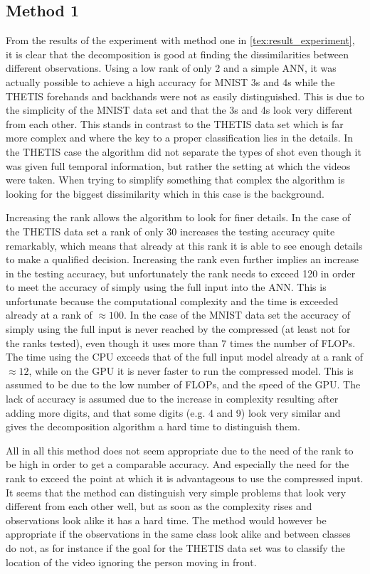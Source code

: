 \subsection{Method 1}
From the results of the experiment with method one in \autoref{tex:result_experiment}, it is clear that the decomposition is good at finding the dissimilarities between different observations. Using a low rank of only 2 and a simple ANN, it was actually possible to achieve a high accuracy for MNIST 3s and 4s while the THETIS forehands and backhands were not as easily distinguished. This is due to the simplicity of the MNIST data set and that the 3s and 4s look very different from each other. This stands in contrast to the THETIS data set which is far more complex and where the key to a proper classification lies in the details. In the THETIS case the algorithm did not separate the types of shot even though it was given full temporal information, but rather the setting at which the videos were taken. When trying to simplify something that complex the algorithm is looking for the biggest dissimilarity which in this case is the background.

Increasing the rank allows the algorithm to look for finer details. In the case of the THETIS data set a rank of only 30 increases the testing accuracy quite remarkably, which means that already at this rank it is able to see enough details to make a qualified decision. Increasing the rank even further implies an increase in the testing accuracy, but unfortunately the rank needs to exceed 120 in order to meet the accuracy of simply using the full input into the ANN. This is unfortunate because the computational complexity and the time is exceeded already at a rank of $\approx 100$. In the case of the MNIST data set the accuracy of simply using the full input is never reached by the compressed (at least not for the ranks tested), even though it uses more than 7 times the number of FLOPs. The time using the CPU exceeds that of the full input model already at a rank of $\approx 12$, while on the GPU it is never faster to run the compressed model. This is assumed to be due to the low number of FLOPs, and the speed of the GPU. The lack of accuracy is assumed due to the increase in complexity resulting after adding more digits, and that some digits (e.g. 4 and 9) look very similar and gives the decomposition algorithm a hard time to distinguish them.

All in all this method does not seem appropriate due to the need of the rank to be high in order to get a comparable accuracy. And especially the need for the rank to exceed the point at which it is advantageous to use the compressed input. It seems that the method can distinguish very simple problems that look very different from each other well, but as soon as the complexity rises and observations look alike it has a hard time. The method would however be appropriate if the observations in the same class look alike and between classes do not, as for instance if the goal for the THETIS data set was to classify the location of the video ignoring the person moving in front.

